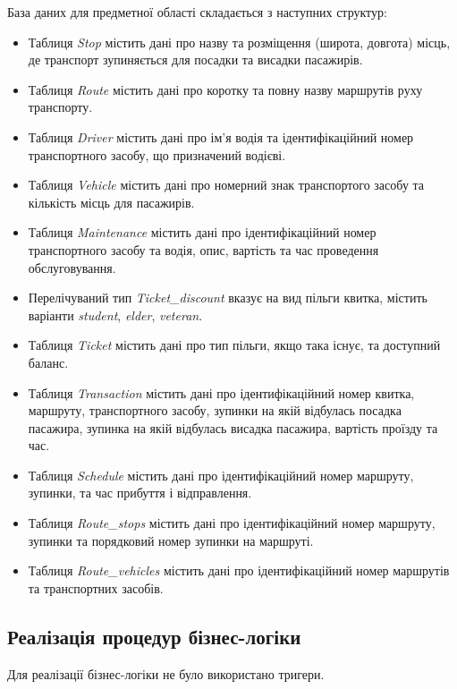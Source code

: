 \documentclass[oneside,14pt]{extarticle}
\begin{document}
База даних для предметної області складається з наступних структур:
\begin{itemize}
\item Таблиця \textit{Stop} містить дані про назву та розміщення (широта, довгота) місць, де транспорт зупиняється для посадки та висадки пасажирів.
\item Таблиця \textit{Route} містить дані про коротку та повну назву маршрутів руху транспорту.
\item Таблиця \textit{Driver} містить дані про ім'я водія та ідентифікаційний номер транспортного засобу, що призначений водієві.
\item Таблиця \textit{Vehicle} містить дані про номерний знак транспортого засобу та кількість місць для пасажирів.
\item Таблиця \textit{Maintenance} містить дані про ідентифікаційний номер транспортного засобу та водія, опис, вартість та час проведення обслуговування.
\item Перелічуваний тип \textit{Ticket\_discount} вказує на вид пільги квитка, містить варіанти \textit{student}, \textit{elder}, \textit{veteran}.
\item Таблиця \textit{Ticket} містить дані про тип пільги, якщо така існує, та доступний баланс.
\item Таблиця \textit{Transaction} містить дані про ідентифікаційний номер квитка, маршруту, транспортного засобу, зупинки на якій відбулась посадка пасажира, зупинка на якій відбулась висадка пасажира, вартість проїзду  та час.
\item Таблиця \textit{Schedule} містить дані про ідентифікаційний номер маршруту, зупинки, та час прибуття і відправлення.
\item Таблиця \textit{Route\_stops} містить дані про ідентифікаційний номер маршруту, зупинки та порядковий номер зупинки на маршруті.
\item Таблиця \textit{Route\_vehicles} містить дані про ідентифікаційний номер маршрутів та транспортних засобів.
\end{itemize}

\subsection{Реалізація процедур бізнес-логіки}
Для реалізації бізнес-логіки не було використано тригери.
\end{document}

